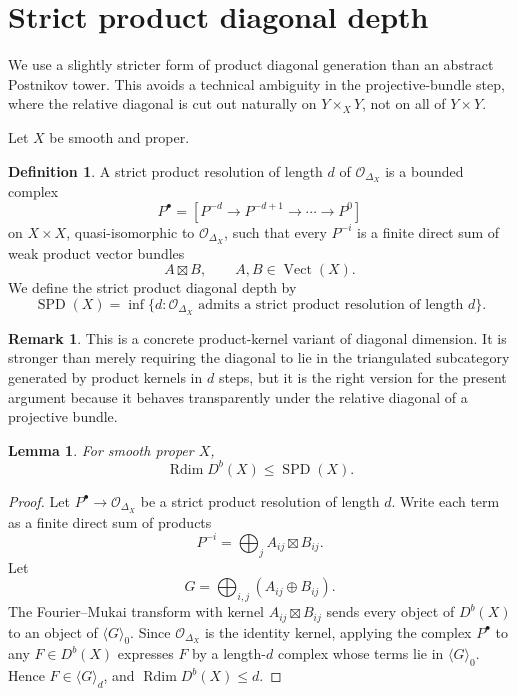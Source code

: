 \documentclass[11pt]{amsart}
\numberwithin{equation}{section}
\newtheorem{lemma}[theorem]{Lemma}
\theoremstyle{definition}
\newtheorem{definition}[theorem]{Definition}
\newtheorem{remark}[theorem]{Remark}
\DeclareMathOperator{\Rdim}{Rdim}
\DeclareMathOperator{\SPD}{SPD}
\begin{document}
\section{Strict product diagonal depth}

We use a slightly stricter form of product diagonal generation than an abstract Postnikov tower. This avoids a technical ambiguity in the projective-bundle step, where the relative diagonal is cut out naturally on $Y\times_XY$, not on all of $Y\times Y$.

Let $X$ be smooth and proper.

\begin{definition}
A strict product resolution of length $d$ of $\mathcal O_{\Delta_X}$ is a bounded complex
\[
P^\bullet=
\left[
P^{-d}\to P^{-d+1}\to\cdots\to P^0
\right]
\]
on $X\times X$, quasi-isomorphic to $\mathcal O_{\Delta_X}$, such that every $P^{-i}$ is a finite direct sum of weak product vector bundles
\[
A\boxtimes B,
\qquad
A,B\in \operatorname{Vect}(X).
\]
We define the strict product diagonal depth by
\[
\SPD(X)=
\inf\{d:\mathcal O_{\Delta_X}\text{ admits a strict product resolution of length }d\}.
\]
\end{definition}

\begin{remark}
This is a concrete product-kernel variant of diagonal dimension. It is stronger than merely requiring the diagonal to lie in the triangulated subcategory generated by product kernels in $d$ steps, but it is the right version for the present argument because it behaves transparently under the relative diagonal of a projective bundle.
\end{remark}

\begin{lemma}
For smooth proper $X$,
\[
\Rdim D^b(X)\le \SPD(X).
\]
\end{lemma}

\begin{proof}
Let $P^\bullet\to \mathcal O_{\Delta_X}$ be a strict product resolution of length $d$. Write each term as a finite direct sum of products
\[
P^{-i}=\bigoplus_j A_{ij}\boxtimes B_{ij}.
\]
Let
\[
G=\bigoplus_{i,j}(A_{ij}\oplus B_{ij}).
\]
The Fourier--Mukai transform with kernel $A_{ij}\boxtimes B_{ij}$ sends every object of $D^b(X)$ to an object of $\langle G\rangle_0$. Since $\mathcal O_{\Delta_X}$ is the identity kernel, applying the complex $P^\bullet$ to any $F\in D^b(X)$ expresses $F$ by a length-$d$ complex whose terms lie in $\langle G\rangle_0$. Hence $F\in\langle G\rangle_d$, and $\Rdim D^b(X)\le d$.
\end{proof}
\end{document}
